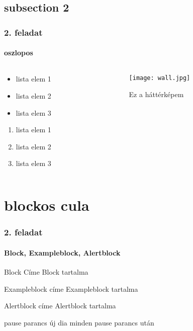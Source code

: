 \documentclass[12pt,aspectratoio=169]{beamer}
\begin{document}
\subsection{subsection 2}
\begin{frame}
\frametitle{2. feladat}
\framesubtitle{oszlopos}
\begin{columns}[c]
\begin{column}{.5\linewidth}
\begin{itemize}
\item<1-> lista elem 1
\item<2-> lista elem 2
\item<3-> \alert<3> {lista elem 3}
\end{itemize}
\begin{enumerate}
\item lista elem 1
\item lista elem 2
\item lista elem 3
\end{enumerate}
\end{column}

\begin{column}{.5\linewidth}
\begin{figure}[h]
\caption{Ez a háttérképem}
\centering
\texttt{[image: wall.jpg]}
\end{figure}
\end{column}
\end{columns}
\end{frame}

\section{blockos cula}
\begin{frame}
\frametitle{2. feladat}
\framesubtitle{Block, Exampleblock, Alertblock}

\begin{block}{Block Címe}
Block tartalma 
\end{block}
\pause
\begin{exampleblock}{Exampleblock címe}
Exampleblock tartalma
\end{exampleblock}
\pause
\begin{alertblock}{Alertblock címe}
Alertblock tartalma
\end{alertblock}

\begin{block}{pause parancs}
új dia minden pause parancs után 
\end{block}

\end{frame}
\end{document}
